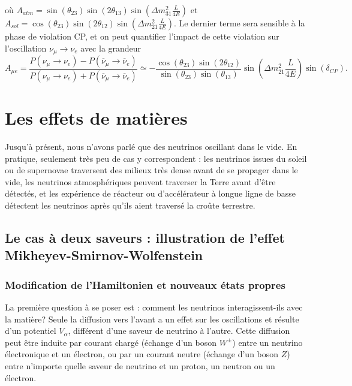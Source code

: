             où $A_{atm} = \sin(\theta_{23})\sin(2\theta_{13})\sin\left(\Delta m^2_{31}\frac{L}{4E}\right)$ et $A_{sol} =\cos(\theta_{23})\sin(2\theta_{12})\sin\left(\Delta m^2_{21}\frac{L}{4E}\right)$. Le dernier terme sera sensible à la phase de violation CP, et on peut quantifier l'impact de cette violation sur l'oscillation $\nu_{\mu}\to\nu_e$ avec la grandeur
            \begin{equation}\label{eq::CP_A_factor}
                A_{\mu e} = \frac{P(\nu_{\mu}\to\nu_e)-P(\overline{\nu}_{\mu}\to\overline{\nu}_e)}{P(\nu_{\mu}\to\nu_e)+P(\overline{\nu}_{\mu}\to\overline{\nu}_e)} \simeq -\frac{\cos(\theta_{23})\sin(2\theta_{12})}{\sin(\theta_{23})\sin(\theta_{13})}\sin\left(\Delta m^2_{21}\frac{L}{4E}\right)\sin(\delta_{CP}).
            \end{equation}


    \section{Les effets de matières}\label{sec::matter_effect}
        Jusqu'à présent, nous n'avons parlé que des neutrinos oscillant dans le vide. En pratique, seulement très peu de cas y correspondent : les neutrinos issues du soleil ou de supernovae traversent des milieux très dense avant de se propager dans le vide, les neutrinos atmosphériques peuvent traverser la Terre avant d'être détectés, et les expérience de réacteur ou d'accélérateur à longue ligne de basse détectent les neutrinos après qu'ils aient traversé la croûte terrestre.
        \subsection{Le cas à deux saveurs : illustration de l'effet Mikheyev-Smirnov-Wolfenstein}
            \subsubsection{Modification de l'Hamiltonien et nouveaux états propres}
            La première question à se poser est : comment les neutrinos interagissent-ils avec la matière? Seule la diffusion vers l'avant a un effet sur les oscillations\cite{Wolfenstein1978,Akhmedov2000} et résulte d'un potentiel $V_{\alpha}$, différent d'une saveur de neutrino à l'autre. Cette diffusion peut être induite par courant chargé (échange d'un boson $W^{\pm}$) entre un neutrino électronique et un électron, ou par un courant neutre (échange d'un boson $Z$) entre n'importe quelle saveur de neutrino et un proton, un neutron ou un électron.
            
